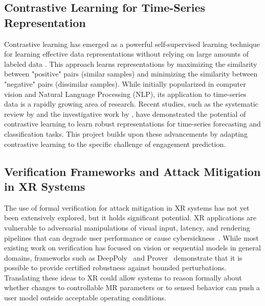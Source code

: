 \documentclass[review]{vgtc}                 %
\begin{document}
\subsection{Contrastive Learning for Time-Series Representation}
Contrastive learning has emerged as a powerful self-supervised learning technique for learning effective data representations without relying on large amounts of labeled data \cite{khosla2020supervised}. This approach learns representations by maximizing the similarity between "positive" pairs (similar samples) and minimizing the similarity between "negative" pairs (dissimilar samples). While initially popularized in computer vision and Natural Language Processing (NLP), its application to time-series data is a rapidly growing area of research. Recent studies, such as the systematic review by \cite{liu2023self} and the investigative work by \cite{zhang2023constitutes}, have demonstrated the potential of contrastive learning to learn robust representations for time-series forecasting and classification tasks. This project builds upon these advancements by adapting contrastive learning to the specific challenge of engagement prediction.

\subsection{Verification Frameworks and Attack Mitigation in XR Systems}

The use of formal verification for attack mitigation in XR systems has not yet been extensively explored, but it holds significant potential. XR applications are vulnerable to adversarial manipulations of visual input, latency, and rendering pipelines that can degrade user performance or cause cybersickness~\cite{islam2020automatic, li2024less}. While most existing work on verification has focused on vision or sequential models in general domains, frameworks such as DeepPoly~\cite{deeppoly} and Prover~\cite{prover} demonstrate that it is possible to provide certified robustness against bounded perturbations. Translating these ideas to XR could allow systems to reason formally about whether changes to controllable MR parameters or to sensed behavior can push a user model outside acceptable operating conditions.
\end{document}
